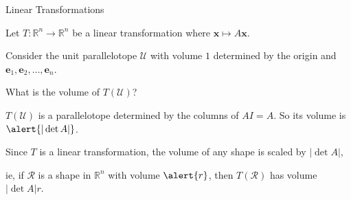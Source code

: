 \documentclass[xcolor=dvipsnames,aspectratio=169,t]{beamer}
\begin{document}
\begin{frame}{Linear Transformations}
\bigskip
  
  Let $T\colon \mathbb{R}^n \to \mathbb{R}^n$ be a linear transformation 
  where $\mathbf{x} \mapsto A \mathbf{x}$.
  
  Consider the unit parallelotope $\mathcal{U}$ with volume $1$ determined by the origin and $\mathbf{e}_1,\mathbf{e}_2,\dots,\mathbf{e}_n$.
  \smallskip
  
  What is the \alert{volume} of $T(\mathcal{U})$?
  \bigskip
  
  \pause
  $T(\mathcal{U})$ is a parallelotope determined by the columns of $A I = A$.
  So its volume is $\alert{|\det A|}$.
  
  \vspace*{2em}
  
  \pause
  Since $T$ is a linear transformation, the volume of \alert{any shape} is scaled by $|\det A|$,
  \smallskip
  
  \quad ie, if $\mathcal{R}$ is a shape in $\mathbb{R}^n$ with volume $\alert{r}$,
  then $T(\mathcal{R})$ has volume \alert{$|\det A|r$}.
    
\end{frame}
\end{document}
